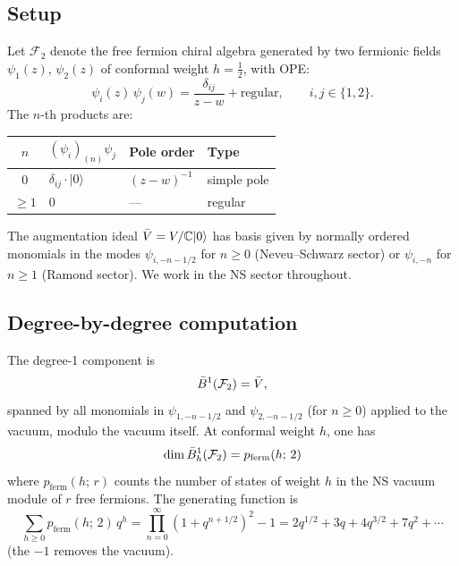 \subsection{Setup}

\begin{computation}
\label{comp:fermion-two-gen-ope}
Let $\mathcal{F}_2$ denote the free fermion chiral algebra generated
by two fermionic fields $\psi_1(z)$, $\psi_2(z)$ of conformal
weight $h = \tfrac{1}{2}$, with OPE:
\begin{equation}\label{eq:fermion-two-gen-ope}
\psi_i(z)\,\psi_j(w) = \frac{\delta_{ij}}{z - w} + \text{regular},
\qquad i, j \in \{1, 2\}.
\end{equation}
The $n$-th products are:
\begin{center}
\renewcommand{\arraystretch}{1.15}
\begin{tabular}{clll}
$n$ & $(\psi_i)_{(n)}\psi_j$ & Pole order & Type \\
\hline
$0$ & $\delta_{ij}\cdot |0\rangle$ & $(z-w)^{-1}$ & simple pole \\
$\geq 1$ & $0$ & --- & regular
\end{tabular}
\end{center}
The augmentation ideal $\bar{V} = V/\mathbb{C}|0\rangle$ has basis given by
normally ordered monomials in the modes
$\psi_{i,-n-1/2}$ for $n \geq 0$ (Neveu--Schwarz sector) or
$\psi_{i,-n}$ for $n \geq 1$ (Ramond sector).
We work in the NS sector throughout.
\end{computation}

\subsection{Degree-by-degree computation}

\begin{computation}[Degree 1]
\label{comp:fermion-deg1}
The degree-1 component is
\[
\bar{B}^1(\mathcal{F}_2) = \bar{V},
\]
spanned by all monomials in $\psi_{1,-n-1/2}$ and $\psi_{2,-n-1/2}$
(for $n \geq 0$) applied to the vacuum, modulo the vacuum itself.
At conformal weight $h$, one has
\[
\dim \bar{B}^1_h(\mathcal{F}_2) = p_{\mathrm{ferm}}(h;\,2)
\]
where $p_{\mathrm{ferm}}(h;\,r)$ counts the number of states of weight $h$
in the NS vacuum module of $r$ free fermions.  The generating function is
\begin{equation}\label{eq:fermion-char}
\sum_{h \geq 0} p_{\mathrm{ferm}}(h;\,2)\,q^h
= \prod_{n=0}^{\infty}(1 + q^{n+1/2})^2 - 1
= 2q^{1/2} + 3q + 4q^{3/2} + 7q^2 + \cdots
\end{equation}
(the $-1$ removes the vacuum).
\end{computation}

